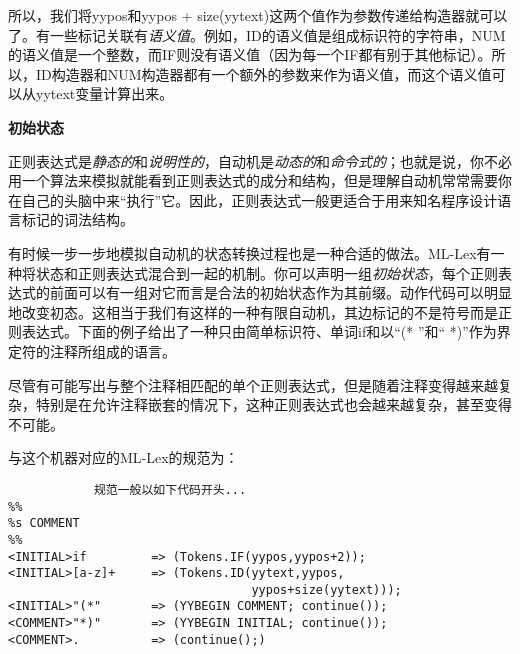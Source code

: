 \documentclass[cn,11pt,chinese]{elegantbook}
\begin{document}
所以，我们将yypos和yypos + size(yytext)这两个值作为参数传递给构造器就可以了。有一些标记关联有\textit{语义值}。例如，ID的语义值是组成标识符的字符串，NUM的语义值是一个整数，而IF则没有语义值（因为每一个IF都有别于其他标记）。所以，ID构造器和NUM构造器都有一个额外的参数来作为语义值，而这个语义值可以从yytext变量计算出来。

\textbf{初始状态}

正则表达式是\textit{静态的}和\textit{说明性的}，自动机是\textit{动态的}和\textit{命令式的}；也就是说，你不必用一个算法来模拟就能看到正则表达式的成分和结构，但是理解自动机常常需要你在自己的头脑中来“执行”它。因此，正则表达式一般更适合于用来知名程序设计语言标记的词法结构。

有时候一步一步地模拟自动机的状态转换过程也是一种合适的做法。ML-Lex有一种将状态和正则表达式混合到一起的机制。你可以声明一组\textit{初始状态}，每个正则表达式的前面可以有一组对它而言是合法的初始状态作为其前缀。动作代码可以明显地改变初态。这相当于我们有这样的一种有限自动机，其边标记的不是符号而是正则表达式。下面的例子给出了一种只由简单标识符、单词if和以“(* ”和“ *)”作为界定符的注释所组成的语言。

\begin{figure}[htbp]
  \centering
\end{figure}

尽管有可能写出与整个注释相匹配的单个正则表达式，但是随着注释变得越来越复杂，特别是在允许注释嵌套的情况下，这种正则表达式也会越来越复杂，甚至变得不可能。

与这个机器对应的ML-Lex的规范为：

\begin{verbatim}
            规范一般以如下代码开头...
%%
%s COMMENT
%%
<INITIAL>if         => (Tokens.IF(yypos,yypos+2));
<INITIAL>[a-z]+     => (Tokens.ID(yytext,yypos,
                                  yypos+size(yytext)));
<INITIAL>"(*"       => (YYBEGIN COMMENT; continue());
<COMMENT>"*)"       => (YYBEGIN INITIAL; continue());
<COMMENT>.          => (continue();)
\end{verbatim}
\end{document}
